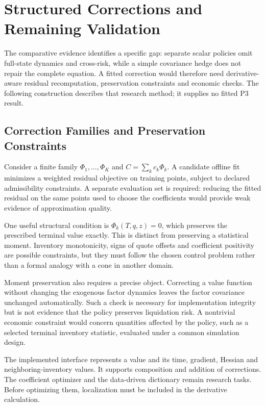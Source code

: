 \chapter{Structured Corrections and Remaining Validation}\label{ch:corrections}
The comparative evidence identifies a specific gap: separate scalar policies omit full-state dynamics and cross-risk, while a simple covariance hedge does not repair the complete equation. A fitted correction would therefore need derivative-aware residual recomputation, preservation constraints and economic checks. The following construction describes that research method; it supplies no fitted P3 result.
\section{Correction Families and Preservation Constraints}


Consider a finite family $\Phi_1,\ldots,\Phi_K$ and $C=\sum_k c_k\Phi_k$. A candidate offline fit minimizes a weighted residual objective on training points, subject to declared admissibility constraints. A separate evaluation set is required: reducing the fitted residual on the same points used to choose the coefficients would provide weak evidence of approximation quality.

One useful structural condition is $\Phi_k(T,q,z)=0$, which preserves the prescribed terminal value exactly. This is distinct from preserving a statistical moment. Inventory monotonicity, signs of quote offsets and coefficient positivity are possible constraints, but they must follow the chosen control problem rather than a formal analogy with a cone in another domain.

Moment preservation also requires a precise object. Correcting a value function without changing the exogenous factor dynamics leaves the factor covariance unchanged automatically. Such a check is necessary for implementation integrity but is not evidence that the policy preserves liquidation risk. A nontrivial economic constraint would concern quantities affected by the policy, such as a selected terminal inventory statistic, evaluated under a common simulation design.

The implemented interface represents a value and its time, gradient, Hessian and neighboring-inventory values. It supports composition and addition of corrections. The coefficient optimizer and the data-driven dictionary remain research tasks. Before optimizing them, localization must be included in the derivative calculation.

